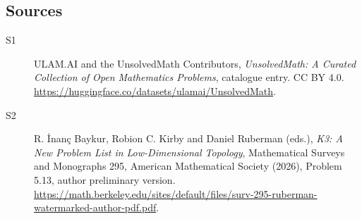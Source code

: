 \documentclass[11pt]{article}
\begin{document}
\subsection{Sources}
\begin{description}
\item[\hypertarget{source:statement:1}{S1}] ULAM.AI and the UnsolvedMath Contributors, \emph{UnsolvedMath: A Curated Collection of Open Mathematics Problems}, catalogue entry. CC BY 4.0. \url{https://huggingface.co/datasets/ulamai/UnsolvedMath}.
\item[\hypertarget{source:statement:2}{S2}] R. İnanç Baykur, Robion C. Kirby and Daniel Ruberman (eds.), \emph{K3: A New Problem List in Low-Dimensional Topology}, Mathematical Surveys and Monographs 295, American Mathematical Society (2026), Problem 5.13, author preliminary version. \url{https://math.berkeley.edu/sites/default/files/surv-295-ruberman-watermarked-author-pdf.pdf}.
\end{description}
\label{end:statement}
\end{document}
